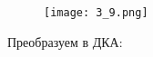 \documentclass[12pt, a4paper]{article}
\begin{document}
\begin{enumerate}
\begin{comment}
digraph {
    rankdir="LR"
    "" [shape=point]
    q1 [shape=circle]
    q2 [shape=circle]
    q3 [shape=circle]
    q4 [shape=circle]
    q5 [shape=circle]
    q6 [shape=circle]
    q7 [shape=circle]
    q8 [shape=circle]
    q9 [shape=circle]
    q10 [shape=circle]
    q11 [shape=doublecircle]

    "" -> q1
    q1 -> q2 [label="a,b"]
    q2 -> q1 [label="a,b"]
    q2 -> q3 [label="a"]
    q2 -> q4 [label="b"]
    q3 -> q5 [label="b"]
    q3 -> q9 [label="a"]
    q4 -> q6 [label="a"]
    q4 -> q10 [label="b"]
    q5 -> q7 [label="a"]
    q6 -> q8 [label="b"]
    q7 -> q9 [label="b"]
    q8 -> q10 [label="a"]
    q9 -> q11 [label="a,b"]
    q10 -> q11 [label="a,b"]
    q11 -> q11 [label="a,b"]
}
\end{comment}

    \begin{figure}[H]
        \centering
        \texttt{[image: 3\_9.png]}
    \end{figure}
 
Преобразуем в ДКА:

\begin{comment}
digraph {
    rankdir="LR"
    "" [shape=point]
    q1 [shape=circle]
    q2 [shape=circle]
    "{q1q3}" [shape=circle]
    "{q2q5}" [shape=circle]
    "{q1q4}" [shape=circle]
    "{q2q6}" [shape=circle]
    "{q1q4q8}" [shape=circle]
    "{q2q6q10}" [shape=circle]
    "{q2q10}" [shape=circle]
    "{q1q3q7}" [shape=circle]
    "{q2q9}" [shape=circle]
    "{q1q3q11}" [shape=doublecircle]
    "{q2q5q11}" [shape=doublecircle]
    "{q2q5q9}" [shape=circle]
    "{q1q3q7q11}" [shape=doublecircle]
    "{q2q9q11}" [shape=doublecircle]
    "{q2q5q9q11}" [shape=doublecircle]
    "{q1q4q11}" [shape=doublecircle]
    "{q2q6q11}" [shape=doublecircle]
    "{q1q4q8q11}" [shape=doublecircle]
    "{q2q6q10q11}" [shape=doublecircle]
    "{q2q10q11}" [shape=doublecircle]


\end{comment}
\end{enumerate}
\end{document}
